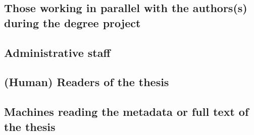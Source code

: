 \documentclass{article}
\begin{document}
\subsection{Those working in parallel with the authors(s) during the degree project}
\label{sec:examinerAdvisorsOpponent}

\subsection{Administrative staff}
\label{sec:adminStaff}

\subsection{(Human) Readers of the thesis}
\label{sec:readers}

\subsection{Machines reading the metadata or full text of the thesis}
\label{sec:searchEngines}
 

%
\end{document}
